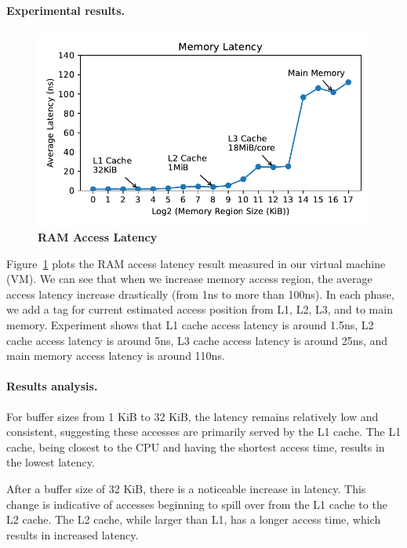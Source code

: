 \paragraph{Experimental results.}
\begin{figure}[t]
	\centering
	\includegraphics[width=0.98\linewidth]{sourcecode/memory/access_latency.pdf}
	\caption{\label{fig:access_lat} \textbf{RAM Access Latency}}
\end{figure}
Figure~\ref{fig:access_lat} plots the RAM access latency result measured in our virtual machine (VM).
We can see that when we increase memory access region, the average access latency increase drastically
(from 1ns to more than 100ns). In each phase, we add a tag for current estimated access position from
L1, L2, L3, and to main memory. Experiment shows that L1 cache access latency is around 1.5ns,
L2 cache access latency is around 5ns, L3 cache access latency is around 25ns, and main memory access
latency is around 110ns.

\paragraph{Results analysis.}
For buffer sizes from 1 KiB to 32 KiB, the latency remains relatively low and consistent, suggesting these accesses are primarily served by the L1 cache. The L1 cache, being closest to the CPU and having the shortest access time, results in the lowest latency.

After a buffer size of 32 KiB, there is a noticeable increase in latency. This change is indicative of accesses beginning to spill over from the L1 cache to the L2 cache. The L2 cache, while larger than L1, has a longer access time, which results in increased latency.

